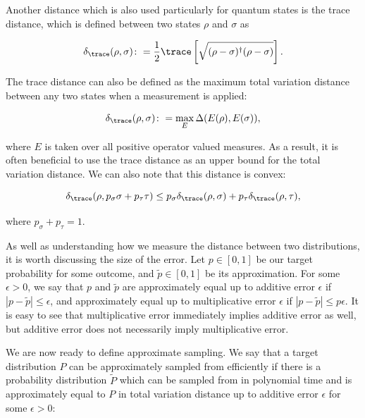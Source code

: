 Another distance which is also used particularly for quantum states is the trace distance, which is defined between two states $\rho$ and $\sigma$ as

\begin{equation}
\delta_{\trace}(\rho, \sigma) \colon= \frac{1}{2}\trace\left[\sqrt{(\rho-\sigma)^\dagger(\rho-\sigma)}\right].
\end{equation}

The trace distance can also be defined as the maximum total variation distance between any two states when a measurement is applied:

\begin{equation}
\delta_{\trace}(\rho, \sigma) \colon= \max_E\Delta(E(\rho), E(\sigma)),
\end{equation}

\noindent where $E$ is taken over all positive operator valued measures.  As a result, it is often beneficial to use the trace distance as an upper bound for the total variation distance. We can also note that this distance is convex:

\begin{equation}
\delta_{\trace}(\rho, p_{\sigma}\sigma + p_{\tau}\tau) \leq p_{\sigma}\delta_{\trace}(\rho, \sigma) + p_{\tau}\delta_{\trace}(\rho, \tau),
\end{equation}

\noindent where $p_\sigma+p_\tau = 1$.

As well as understanding how we measure the distance between two distributions, it is worth discussing the size of the error. Let $p \in [0,1]$ be our target probability for some outcome, and $\tilde{p} \in [0,1]$ be its approximation. For some $\epsilon > 0$, we say that $p$ and $\tilde{p}$ are approximately equal up to additive error $\epsilon$ if $|p-\tilde{p}|\leq \epsilon$, and approximately equal up to multiplicative error $\epsilon$ if $|p-\tilde{p}|\leq p\epsilon$. It is easy to see that multiplicative error immediately implies additive error as well, but additive error does not necessarily imply multiplicative error.

We are now ready to define approximate sampling. We say that a target distribution $P$ can be approximately sampled from efficiently if there is a probability distribution $\tilde{P}$ which can be sampled from in polynomial time and is approximately equal to $P$ in total variation distance up to additive error $\epsilon$ for some $\epsilon > 0$:

